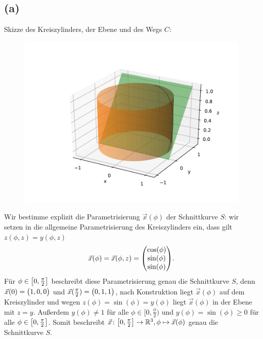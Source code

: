 \documentclass{theozettel}
\begin{document}
\subsection*{(a)}Skizze des Kreiszylinders, der Ebene und des Wegs $C$:
	\begin{figure}[H]
	\centering
	\includegraphics[scale=1]{zylinderplot.pdf}
	\end{figure}
Wir bestimme explizit die Parametrisierung $\vec{x}(\phi)$ der Schnittkurve $S$: wir setzen in die allgemeine Parametrisierung des Kreiszylinders ein, dass gilt $z(\phi,z) = y(\phi,z)$
	\[
		\vec{x}(\phi) = \vec{x}(\phi,z) = \mqty(\cos(\phi) \\ \sin(\phi) \\ \sin(\phi)).
	\]
Für $\phi \in \qty[0,\frac{\pi}{2}]$ beschreibt diese Parametrisierung genau die Schnittkurve $S$, denn $\vec{x}(0) = \mqty(1,0,0)$ und $\vec{x}(\frac{\pi}{2}) = \mqty(0,1,1)$, nach Konstruktion liegt $\vec{x}(\phi)$ auf dem Kreiszylinder und wegen $z(\phi) = \sin(\phi) = y(\phi)$  liegt $\vec{x}(\phi)$ in der Ebene mit $z=y$. Außerdem $y(\phi) \neq 1$ für alle $\phi \in [0,\frac{\phi}{2})$ und $y(\phi) = \sin(\phi) \geq 0$ für alle $\phi \in \qty[0,\frac{\pi}{2}]$. Somit beschreibt $\vec{x} \colon \qty[0,\frac{\pi}{2}] \to \mathbb{R}^{3}, \phi \mapsto \vec{x}(\phi)$ genau die Schnittkurve $S$. 
\end{document}
